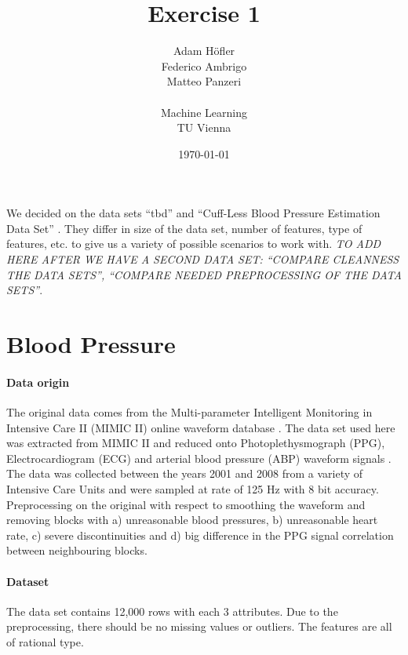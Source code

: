 \documentclass[12pt, DIV=13, titlepage, headinclude]{scrartcl}
\begin{document}
\title{Exercise 1}
\date{\today}
\author{	Adam Höfler \\
		Federico Ambrigo \\
		Matteo Panzeri \\ \\
		Machine Learning\\ TU Vienna}
\maketitle

\newpage

We decided on the data sets \enquote{tbd} and \enquote{Cuff-Less Blood Pressure Estimation Data Set} \cite{BloodPressure}. They differ in size of the data set, number of features, type of features, etc. to give us a variety of possible scenarios to work with. \textit{TO ADD HERE AFTER WE HAVE A SECOND DATA SET: \enquote{COMPARE CLEANNESS THE DATA SETS}, \enquote{COMPARE NEEDED PREPROCESSING OF THE DATA SETS}}.

\section*{Blood Pressure}

\paragraph{Data origin}
The original data comes from the Multi-parameter Intelligent Monitoring in Intensive Care II (MIMIC II) online waveform database \cite{BloodPressureDatabase}\cite{Goldberger2000PhysioBankPA}. The data set used here was extracted from MIMIC II and reduced onto Photoplethysmograph (PPG), Electrocardiogram (ECG) and arterial blood pressure (ABP) waveform signals \cite{Kachuee2015CufflessHC}. The data was collected between the years 2001 and 2008 from a variety of Intensive Care Units and were sampled at rate of 125 Hz with 8 bit accuracy. Preprocessing on the original with respect to smoothing the waveform and removing blocks with a) unreasonable blood pressures, b) unreasonable heart rate, c) severe discontinuities and d) big difference in the PPG signal correlation between neighbouring blocks.

\paragraph{Dataset}
\noindent The data set contains 12,000 rows with each 3 attributes. Due to the preprocessing, there should be no missing values or outliers. The features are all of rational type.
\end{document}
